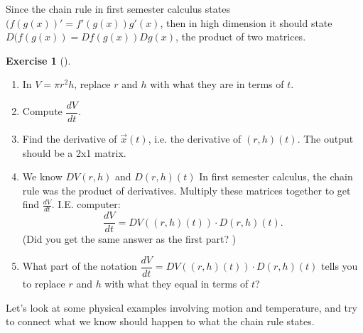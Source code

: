 \documentclass[10pt,]{book}
\theoremstyle{plain}
\theoremstyle{definition}
\theoremstyle{definition}
\theoremstyle{definition}
\theoremstyle{definition}
\newtheorem{exploration}[project]{Exercise}
\theoremstyle{definition}
\numberwithin{equation}{section}
\begin{document}
\par
Since the chain rule in first semester calculus states \((f(g(x))'=f'(g(x))g'(x)\), then in high dimension it should state \(D(f(g(x)) = Df(g(x))Dg(x)\), the product of two matrices.%
\begin{exploration}[]\label{chain_rule_two}
\leavevmode%
\begin{enumerate}[font=\bfseries,label=(\alph*),ref=\alph*]
\item\label{task-336} In \(V=\pi r^2 h\), replace \(r\) and \(h\) with what they are in terms of \(t\).%
\item\label{task-337} Compute \(\dfrac{dV}{dt}\).%
\item\label{task-338} Find the derivative of \(\vec x (t)\), i.e. the derivative of \((r,h)(t)\). The output should be a 2x1 matrix.%
%
\item\label{task-339} We know \(DV(r,h)\) and \(D(r,h)(t)\) In first semester calculus, the chain rule was the product of derivatives. Multiply these matrices together to get find \(\frac{dV}{dt}\). I.E. computer:%
\begin{equation*}
\dfrac{dV}{dt}=DV((r,h)(t))\cdot D(r,h)(t).
\end{equation*}
(Did you get the same answer as the first part? )%
\item\label{task-340} What part of the notation \(\dfrac{dV}{dt}=DV((r,h)(t))\cdot D(r,h)(t)\) tells you to replace \(r\) and \(h\) with what they equal in terms of \(t\)?%
\end{enumerate}
\end{exploration}
Let's look at some physical examples involving motion and temperature, and try to connect what we know should happen to what the chain rule states.%
\end{document}
